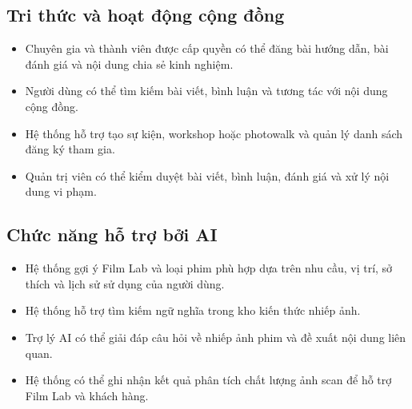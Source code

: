\subsection{Tri thức và hoạt động cộng đồng}
\begin{itemize}
    \item Chuyên gia và thành viên được cấp quyền có thể đăng bài hướng dẫn, bài đánh giá và nội dung chia sẻ kinh nghiệm.
    \item Người dùng có thể tìm kiếm bài viết, bình luận và tương tác với nội dung cộng đồng.
    \item Hệ thống hỗ trợ tạo sự kiện, workshop hoặc photowalk và quản lý danh sách đăng ký tham gia.
    \item Quản trị viên có thể kiểm duyệt bài viết, bình luận, đánh giá và xử lý nội dung vi phạm.
\end{itemize}

\subsection{Chức năng hỗ trợ bởi AI}
\begin{itemize}
    \item Hệ thống gợi ý Film Lab và loại phim phù hợp dựa trên nhu cầu, vị trí, sở thích và lịch sử sử dụng của người dùng.
    \item Hệ thống hỗ trợ tìm kiếm ngữ nghĩa trong kho kiến thức nhiếp ảnh.
    \item Trợ lý AI có thể giải đáp câu hỏi về nhiếp ảnh phim và đề xuất nội dung liên quan.
    \item Hệ thống có thể ghi nhận kết quả phân tích chất lượng ảnh scan để hỗ trợ Film Lab và khách hàng.
\end{itemize}
